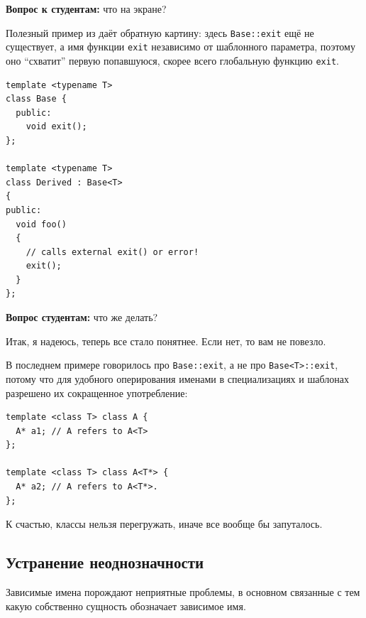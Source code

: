 \documentclass[a4paper,12pt,oneside]{book}
\newif\ifanswers
\begin{document}
\textbf{Вопрос к студентам:} что на экране?

\ifanswers
Правильный ответ: TS. 

Более специальная функция \lstinline!foo! просто ещё не объявлена в точке вызова \lstinline!foo(x)!, а вот разрешение вызова \lstinline!foo(t)! откладывается до подстановки \lstinline!t!, которая происходит после объявления более специальной функции.
\fi

Полезный пример из \cite{vandervoord} даёт обратную картину: здесь \lstinline!Base::exit! ещё не существует, а имя функции \lstinline!exit! независимо от шаблонного параметра, поэтому оно ``схватит'' первую попавшуюся, скорее всего глобальную функцию \lstinline!exit!.

\begin{lstlisting}
template <typename T> 
class Base { 
  public: 
    void exit(); 
};

template <typename T> 
class Derived : Base<T> 
{ 
public: 
  void foo() 
  { 
    // calls external exit() or error! 
    exit();   
  } 
}; 
\end{lstlisting}

\textbf{Вопрос студентам:} что же делать?

\ifanswers
Правильный ответ: сделать \lstinline!exit! зависимым именем, например явно употребив \lstinline!Base::exit()!
\fi

Итак, я надеюсь, теперь все стало понятнее. Если нет, то вам не повезло.

В последнем примере говорилось про \lstinline!Base::exit!, а не про \lstinline!Base<T>::exit!, потому что для удобного оперирования именами в специализациях и шаблонах разрешено их сокращенное употребление:

\begin{lstlisting}
template <class T> class A {
  A* a1; // A refers to A<T>
};

template <class T> class A<T*> {
  A* a2; // A refers to A<T*>.
};
\end{lstlisting}

К счастью, классы нельзя перегружать, иначе все вообще бы запуталось.

\subsection{Устранение неоднозначности}\label{FriendTypename}

Зависимые имена порождают неприятные проблемы, в основном связанные с тем какую собственно сущность обозначает зависимое имя.
\end{document}
